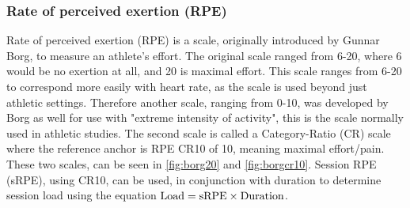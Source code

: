 \subsubsection{Rate of perceived exertion (RPE)} \label{subsub:rpe}
Rate of perceived exertion (RPE) is a scale, originally introduced by Gunnar Borg, to measure an athlete's effort. The original scale ranged from 6-20, where 6 would be no exertion at all, and 20 is maximal effort. This scale ranges from 6-20 to correspond more easily with heart rate, as the scale is used beyond just athletic settings. Therefore another scale, ranging from 0-10, was developed by Borg as well for use with "extreme intensity of activity", this is the scale normally used in athletic studies. The second scale is called a Category-Ratio (CR) scale where the reference anchor is RPE CR10 of 10, meaning maximal effort/pain. These two scales, can be seen in \autoref{fig:borg20} and \autoref{fig:borgcr10}. Session RPE (sRPE), using CR10, can be used, in conjunction with duration to determine session load \cite{Williams2017} using the equation $\textnormal{Load} = \textnormal{sRPE} \times \textnormal{Duration}$.


